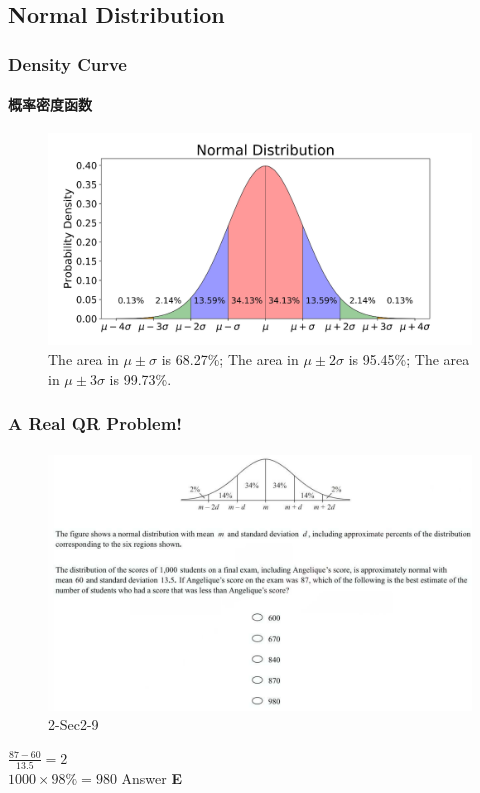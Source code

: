 \documentclass[
	11pt, %
]{beamer}
\begin{document}
\subsection{Normal Distribution}

\begin{frame}
	\frametitle{Density Curve}
	\framesubtitle{概率密度函数}
	\begin{figure}
		\includegraphics[width=0.8\linewidth]{Normal.png}
		\caption{The area in $\mu \pm \sigma$ is 68.27\%; The area in $\mu \pm 2\sigma$ is 95.45\%;  The area in $\mu \pm 3\sigma$ is 99.73\%.}
	\end{figure}
\end{frame}


\begin{frame}
	\frametitle{A Real QR Problem!}
	\framesubtitle{}
	\begin{figure}
		\includegraphics[width=\linewidth]{Normal_Example_Question.png}
		\caption{2-Sec2-9}
	\end{figure}
	\pause
$\frac{87 - 60}{13.5} = 2$\\
$1000 \times 98\% = 980$
\pause
\bigskip
Answer \textbf{E} 
\end{frame}
\end{document}
